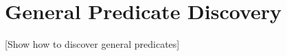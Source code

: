 \section{General Predicate Discovery}
\label{sec:discover}
[Show how to discover general predicates]

